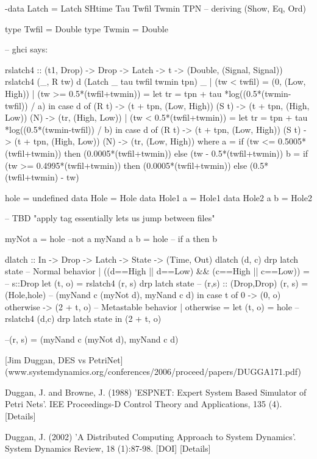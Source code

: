 {-data Latch = Latch SHtime Tau Twfil Twmin TPN
--  deriving (Show, Eq, Ord)

type Twfil = Double
type Twmin = Double

-- ghci says:

rslatch4 :: (t1, Drop) -> Drop -> Latch -> t -> (Double, (Signal, Signal))
rslatch4 (_, R tw) d (Latch _ tau twfil twmin tpn) _
  | (tw < twfil) = (0, (Low, High))
  | (tw >= 0.5*(twfil+twmin)) =
      let tr = tpn + tau *log((0.5*(twmin-twfil)) / a)
        in case d of
               (R t) -> (t + tpn, (Low, High))
               (S t) -> (t + tpn, (High, Low))
               (N)   -> (tr, (High, Low))
  | (tw < 0.5*(twfil+twmin)) =
      let tr = tpn + tau *log((0.5*(twmin-twfil)) / b)
        in case d of
               (R t) -> (t + tpn, (Low, High))
               (S t) -> (t + tpn, (High, Low))
               (N)   -> (tr, (Low, High))
          where
            a = if (tw <= 0.5005*(twfil+twmin))
                then (0.0005*(twfil+twmin))
                else (tw - 0.5*(twfil+twmin))
            b = if (tw >= 0.4995*(twfil+twmin))
                then (0.0005*(twfil+twmin))
                else (0.5*(twfil+twmin) - tw)

hole = undefined
data Hole = Hole
data Hole1 a = Hole1
data Hole2 a b = Hole2

-- TBD "apply tag essentially lets us jump between files"

myNot a = hole --not a
myNand a b = hole -- if a then b

dlatch :: In -> Drop -> Latch -> State -> (Time, Out)
dlatch (d, c) drp latch state
  -- Normal behavior
  | ((d==High || d==Low) && (c==High || c==Low)) =
                  -- s::Drop
      let (t, o) = rslatch4 (r, s) drp latch state
       -- (r,s) :: (Drop,Drop) 
          (r, s) = (Hole,hole) -- (myNand c (myNot d), myNand c d)
      in
      case t of
           0         -> (0, o)
           otherwise -> (2 + t, o)
  -- Metastable behavior
  | otherwise =
     let (t, o) = hole --rslatch4 (d,c) drp latch state
     in (2 + t, o)

--(r, s) = (myNand c (myNot d), myNand c d)

[Jim Duggan, DES vs PetriNet](www.systemdynamics.org/conferences/2006/proceed/papers/DUGGA171.pdf)

Duggan, J. and Browne, J. (1988) 'ESPNET: Expert System Based Simulator of Petri Nets'. IEE Proceedings-D Control Theory and Applications, 135 (4). [Details]

Duggan, J. (2002) 'A Distributed Computing Approach to System Dynamics'. System Dynamics Review, 18 (1):87-98. [DOI] [Details]


}
